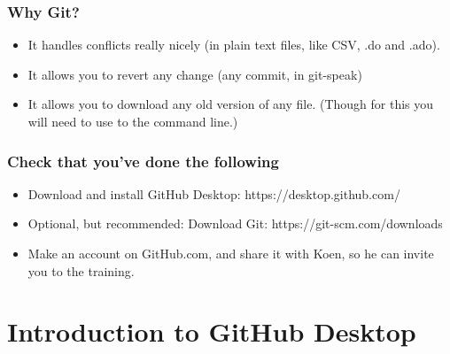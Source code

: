 \documentclass{beamer}
\begin{document}

\begin{frame}
	\frametitle{Why Git?}
	\begin{itemize}
		\item It handles conflicts really nicely (in plain text files, like CSV, .do and .ado).
		\item It allows you to revert any change (any commit, in git-speak)
		\item It allows you to download any old version of any file. (Though for this you will need to use to the command line.)
	\end{itemize}
\end{frame}


\begin{frame}
\frametitle{Check that you've done the following}
	\begin{itemize}
		\item Download and install GitHub Desktop: https://desktop.github.com/
		\item Optional, but recommended: Download Git: https://git-scm.com/downloads 
		\item Make an account on GitHub.com, and share it with Koen, so he can invite you to the training.
	\end{itemize}
\end{frame}

\section{Introduction to GitHub Desktop}
\end{document}
